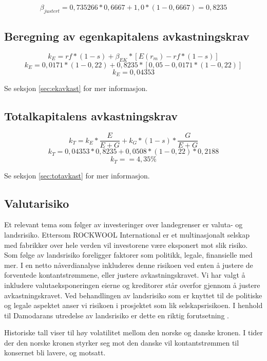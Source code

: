 \[\beta_{justert} = 0,735266 * 0,6667 + 1,0 * (1 - 0,6667) = 0,8235\]

\subsection{Beregning av egenkapitalens avkastningskrav}
\[k_E = rf * (1-s) + \beta_{EK} * [E(r_m)-rf * (1-s)] \]
\[k_E =0,0171*(1-0,22)+0,8235*[0,05-0,0171*(1-0,22)]\]
\[k_E =0,04353\]
\begin{center}Se seksjon \ref{sec:ekavkast} for mer informasjon.\end{center}

\subsection{Totalkapitalens avkastningskrav}
\[k_T = k_E * \frac{E}{E + G} + k_G * (1-s) * \frac{G}{E + G}\]
\[k_T = 0,04353*0,8235+0,0508*(1-0,22)*0,2188\]
\[k_T = =4,35\%\]
\begin{center}Se seksjon \ref{sec:totavkast} for mer informasjon.\end{center}

\subsection{Valutarisiko} 
Et relevant tema som følger av investeringer over landegrenser er valuta- og landsrisiko. Ettersom ROCKWOOL International er et multinasjonalt selskap med fabrikker over hele verden vil investorene være eksponert mot slik risiko. Som følge av landsrisiko foreligger faktorer som politikk, legale, finansielle med mer. I en netto nåverdianalyse inkluderes denne risikoen ved enten å justere de forventede kontantstrømmene, eller justere avkastningskravet. Vi har valgt å inkludere valutaeksponeringen eierne og kreditorer står overfor gjennom å justere avkastningskravet. Ved behandlingen av landsrisiko som er knyttet til de politiske og legale aspektet anser vi risikoen i prosjektet som lik selskapsrisikoen. I henhold til Damodarans utredelse av landsrisiko er dette en riktig forutsetning \cite{adamodar}.

\indent \newline
Historiske tall viser til høy volatilitet mellom den norske og danske kronen. I tider der den norske kronen styrker seg mot den danske vil kontantstrømmen til konsernet bli lavere, og motsatt.

